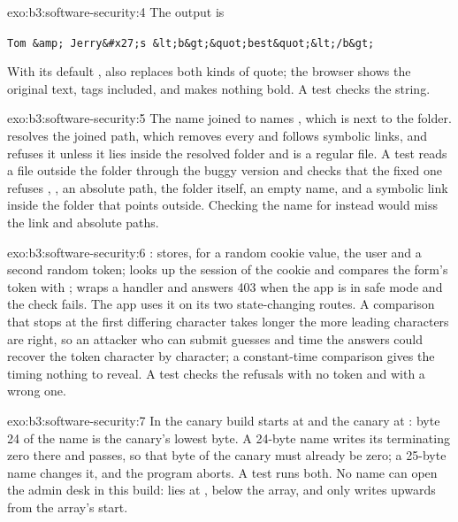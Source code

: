 \begin{solution}{exo:b3:software-security:4}
The output is
\begin{center}\texttt{Tom \&amp; Jerry\&\#x27;s \&lt;b\&gt;\&quot;best\&quot;\&lt;/b\&gt;}\end{center}
With its default ,  also replaces both kinds of quote; the browser shows the original text, tags included, and makes nothing bold. A test checks the string.
\end{solution}

\begin{solution}{exo:b3:software-security:5}
The name  joined to  names , which is  next to the folder.  resolves the joined path, which removes every  and follows symbolic links, and refuses it unless it lies inside the resolved folder and is a regular file. A test reads a file outside the folder through the buggy version and checks that the fixed one refuses , , an absolute path, the folder itself, an empty name, and a symbolic link inside the folder that points outside. Checking the name for  instead would miss the link and absolute paths.
\end{solution}

\begin{solution}{exo:b3:software-security:6}
:  stores, for a random cookie value, the user and a second random token;  looks up the session of the cookie and compares the form's token with ;  wraps a handler and answers 403 when the app is in safe mode and the check fails. The app uses it on its two state-changing routes. A comparison that stops at the first differing character takes longer the more leading characters are right, so an attacker who can submit guesses and time the answers could recover the token character by character; a constant-time comparison gives the timing nothing to reveal. A test checks the refusals with no token and with a wrong one.
\end{solution}

\begin{solution}{exo:b3:software-security:7}
In the canary build  starts at  and the canary at : byte 24 of the name is the canary's lowest byte. A 24-byte name writes its terminating zero there and passes, so that byte of the canary must already be zero; a 25-byte name changes it, and the program aborts. A test runs both. No name can open the admin desk in this build:  lies at , below the array, and  only writes upwards from the array's start.
\end{solution}


